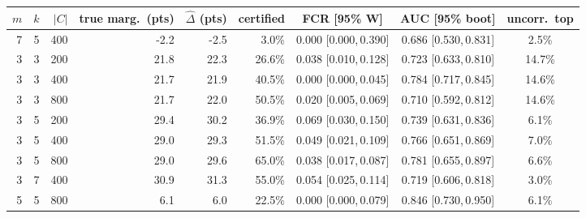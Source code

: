\begin{tabular}{rrrrrrccc}
\toprule
$m$ & $k$ & $|C|$ & true marg.\ (pts) & $\hat\Delta$ (pts) & certified &
FCR [95\% W] & AUC [95\% boot] & uncorr.\ top \\
\midrule
7 & 5 & 400 & -2.2 & -2.5 & 3.0\% & 0.000 [0.000,\,0.390] & 0.686 [0.530,\,0.831] & 2.5\% \\
3 & 3 & 200 & 21.8 & 22.3 & 26.6\% & 0.038 [0.010,\,0.128] & 0.723 [0.633,\,0.810] & 14.7\% \\
3 & 3 & 400 & 21.7 & 21.9 & 40.5\% & 0.000 [0.000,\,0.045] & 0.784 [0.717,\,0.845] & 14.6\% \\
3 & 3 & 800 & 21.7 & 22.0 & 50.5\% & 0.020 [0.005,\,0.069] & 0.710 [0.592,\,0.812] & 14.6\% \\
3 & 5 & 200 & 29.4 & 30.2 & 36.9\% & 0.069 [0.030,\,0.150] & 0.739 [0.631,\,0.836] & 6.1\% \\
3 & 5 & 400 & 29.0 & 29.3 & 51.5\% & 0.049 [0.021,\,0.109] & 0.766 [0.651,\,0.869] & 7.0\% \\
3 & 5 & 800 & 29.0 & 29.6 & 65.0\% & 0.038 [0.017,\,0.087] & 0.781 [0.655,\,0.897] & 6.6\% \\
3 & 7 & 400 & 30.9 & 31.3 & 55.0\% & 0.054 [0.025,\,0.114] & 0.719 [0.606,\,0.818] & 3.0\% \\
5 & 5 & 800 & 6.1 & 6.0 & 22.5\% & 0.000 [0.000,\,0.079] & 0.846 [0.730,\,0.950] & 6.1\% \\
\bottomrule
\end{tabular}
